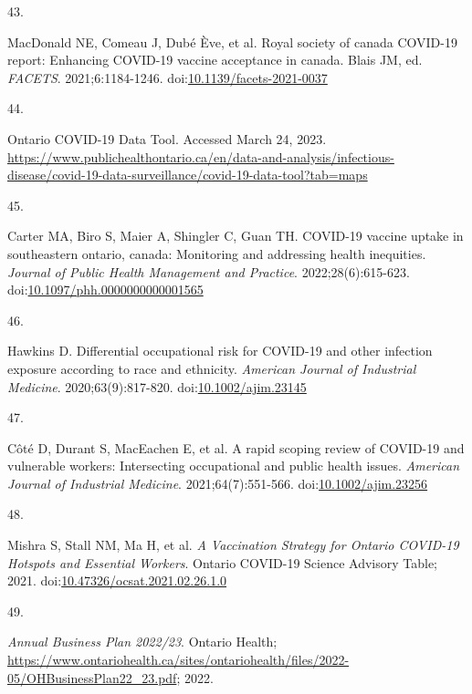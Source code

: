 \documentclass[
  letterpaper,
  DIV=11,
  numbers=noendperiod]{scrartcl}
\newlength{\cslhangindent}
\newlength{\csllabelwidth}
\newlength{\cslentryspacingunit} %
\newenvironment{CSLReferences}[2] %
 {%
  \setlength{\parindent}{0pt}
  \ifodd #1
  \let\oldpar\par
  \def\par{\hangindent=\cslhangindent\oldpar}
  \fi
  \setlength{\parskip}{#2\cslentryspacingunit}
 }%
 {}
\newcommand{\CSLLeftMargin}[1]{\parbox[t]{\csllabelwidth}{#1}}
\newcommand{\CSLRightInline}[1]{\parbox[t]{\linewidth - \csllabelwidth}{#1}\break}
\begin{document}
\begin{CSLReferences}{0}{0}
\leavevmode{}%
\CSLLeftMargin{43. }%
\CSLRightInline{MacDonald NE, Comeau J, Dubé Ève, et al. Royal society
of canada {COVID}-19 report: Enhancing {COVID}-19 vaccine acceptance in
canada. Blais JM, ed. \emph{{FACETS}}. 2021;6:1184-1246.
doi:\href{https://doi.org/10.1139/facets-2021-0037}{10.1139/facets-2021-0037}}

\leavevmode{}%
\CSLLeftMargin{44. }%
\CSLRightInline{{Ontario COVID-19 Data Tool}. Accessed March 24, 2023.
\url{https://www.publichealthontario.ca/en/data-and-analysis/infectious-disease/covid-19-data-surveillance/covid-19-data-tool?tab=maps}}

\leavevmode{}%
\CSLLeftMargin{45. }%
\CSLRightInline{Carter MA, Biro S, Maier A, Shingler C, Guan TH.
{COVID}-19 vaccine uptake in southeastern ontario, canada: Monitoring
and addressing health inequities. \emph{Journal of Public Health
Management and Practice}. 2022;28(6):615-623.
doi:\href{https://doi.org/10.1097/phh.0000000000001565}{10.1097/phh.0000000000001565}}

\leavevmode{}%
\CSLLeftMargin{46. }%
\CSLRightInline{Hawkins D. Differential occupational risk for {COVID}-19
and other infection exposure according to race and ethnicity.
\emph{American Journal of Industrial Medicine}. 2020;63(9):817-820.
doi:\href{https://doi.org/10.1002/ajim.23145}{10.1002/ajim.23145}}

\leavevmode{}%
\CSLLeftMargin{47. }%
\CSLRightInline{Côté D, Durant S, MacEachen E, et al. A rapid scoping
review of {COVID}-19 and vulnerable workers: Intersecting occupational
and public health issues. \emph{American Journal of Industrial
Medicine}. 2021;64(7):551-566.
doi:\href{https://doi.org/10.1002/ajim.23256}{10.1002/ajim.23256}}

\leavevmode{}%
\CSLLeftMargin{48. }%
\CSLRightInline{Mishra S, Stall NM, Ma H, et al. \emph{A Vaccination
Strategy for Ontario {COVID}-19 Hotspots and Essential Workers}. Ontario
{COVID}-19 Science Advisory Table; 2021.
doi:\href{https://doi.org/10.47326/ocsat.2021.02.26.1.0}{10.47326/ocsat.2021.02.26.1.0}}

\leavevmode{}%
\CSLLeftMargin{49. }%
\CSLRightInline{\emph{{A}nnual {B}usiness {P}lan 2022/23}. Ontario
Health;
\url{https://www.ontariohealth.ca/sites/ontariohealth/files/2022-05/OHBusinessPlan22_23.pdf};
2022.}


\end{CSLReferences}
\end{document}
